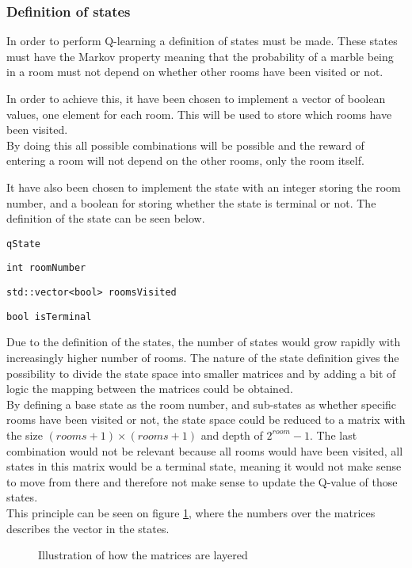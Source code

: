 \documentclass[../Head/Main.tex]{subfiles}
\begin{document}
\subsubsection{Definition of states}
In order to perform Q-learning a definition of states must be made. These states must have the Markov property meaning that the probability of a marble being in a room must not depend on whether other rooms have been visited or not.\par 
In order to achieve this, it have been chosen to implement a vector of boolean values, one element for each room. This will be used to store which rooms have been visited.\\
By doing this all possible combinations will be possible and the reward of entering a room will not depend on the other rooms, only the room itself.\par 
It have also been chosen to implement the state with an integer storing the room number, and a boolean for storing whether the state is terminal or not. The definition of the state can be seen below.
\begin{Indentation}
	\item \texttt{qState} \vspace{-2pt}
	\begin{Indentation}
		\item \texttt{int roomNumber} \vspace{-2pt}
		\item \texttt{std::vector<bool> roomsVisited} \vspace{-2pt}
		\item \texttt{bool isTerminal}
	\end{Indentation}
\end{Indentation}
Due to the definition of the states, the number of states would grow rapidly with increasingly higher number of rooms. The nature of the state definition gives the possibility to divide the state space into smaller matrices and by adding a bit of logic the mapping between the matrices could be obtained.\\
By defining a base state as the room number, and sub-states as whether specific rooms have been visited or not, the state space could be reduced to a matrix with the size $(rooms + 1)\times(rooms + 1)$ and depth of $2^{room}-1$. The last combination would not be relevant because all rooms would have been visited, all states in this matrix would be a terminal state, meaning it would not make sense to move from there and therefore not make sense to update the Q-value of those states.\\
This principle can be seen on figure \ref{fig:3D-matrix}, where the numbers over the matrices describes the vector in the states.  
\begin{figure}[H]
	\centering
	
	\caption{Illustration of how the matrices are layered}
	\label{fig:3D-matrix}
\end{figure}
\end{document}
